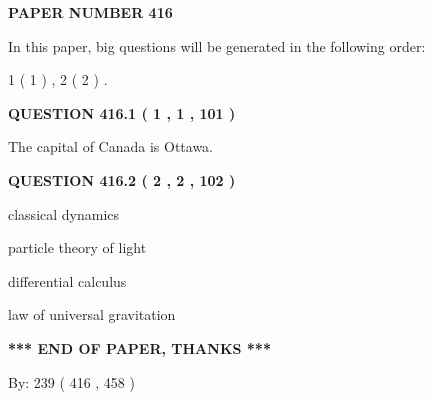 \documentclass[12pt]{article}
\begin{document}
 
 
   
   
\newpage 
\setcounter{page}{ 
   416001 } 
   
   
   
   
 {\textbf{ \Large{ PAPER NUMBER  416  }}}
   
   
\vspace{0.2in}
   
   
   
   
   
\vspace{0.2in}
   
In this paper, big questions will be generated in the following order: 
   
   
   1 ( 1 )
 ,
   2 ( 2 )
 .
  
\vspace{0.2in}
  
{\textbf{\Large{QUESTION
416.1 
 ( 1 , 1 , 101 )
}}}
  
  
 
 
\noindent{}
 
 
The capital of Canada is Ottawa.
 
 
 
 
  
\vspace{0.2in}
  
{\textbf{\Large{QUESTION
416.2 
 ( 2 , 2 , 102 )
}}}
  
  
 
 
\noindent{}
 
 
classical dynamics
 
 
particle theory of light
 
 
differential calculus
 
 
law of universal gravitation
 
 
 
 
   
   
\vspace{1.0in} 
{\textbf{\large{ *** END OF PAPER, THANKS *** }}} 
   
   
\hspace{1.0in} By: 
 239 ( 416 ,  458 )
   
\end{document}
